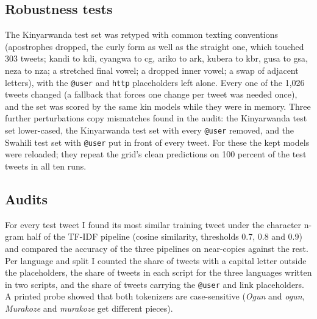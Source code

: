 \documentclass[11pt]{article}
\begin{document}
\subsection{Robustness tests}
The Kinyarwanda test set was retyped with common texting conventions (apostrophes dropped, the curly form as well as the straight one, which touched 303 tweets; kandi to kdi, cyangwa to cg, ariko to ark, kubera to kbr, gusa to gsa, neza to nza; a stretched final vowel; a dropped inner vowel; a swap of adjacent letters), with the \texttt{@user} and \texttt{http} placeholders left alone. Every one of the 1,026 tweets changed (a fallback that forces one change per tweet was needed once), and the set was scored by the same kin models while they were in memory. Three further perturbations copy mismatches found in the audit: the Kinyarwanda test set lower-cased, the Kinyarwanda test set with every \texttt{@user} removed, and the Swahili test set with \texttt{@user} put in front of every tweet. For these the kept models were reloaded; they repeat the grid's clean predictions on 100 percent of the test tweets in all ten runs.

\subsection{Audits}
\label{sec:audit-method}
For every test tweet I found its most similar training tweet under the character n-gram half of the TF-IDF pipeline (cosine similarity, thresholds 0.7, 0.8 and 0.9) and compared the accuracy of the three pipelines on near-copies against the rest. Per language and split I counted the share of tweets with a capital letter outside the placeholders, the share of tweets in each script for the three languages written in two scripts, and the share of tweets carrying the \texttt{@user} and link placeholders. A printed probe showed that both tokenizers are case-sensitive (\emph{Ogun} and \emph{ogun}, \emph{Murakoze} and \emph{murakoze} get different pieces).
\end{document}
